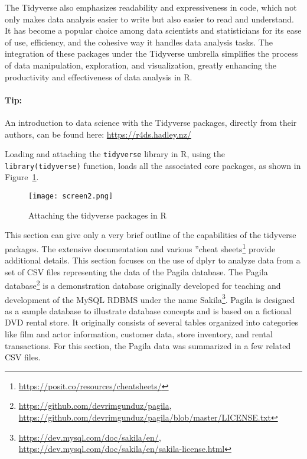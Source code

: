 The Tidyverse also emphasizes readability and expressiveness in code, which not only makes data analysis easier to write but also easier to read and understand. It has become a popular choice among data scientists and statisticians for its ease of use, efficiency, and the cohesive way it handles data analysis tasks. The integration of these packages under the Tidyverse umbrella simplifies the process of data manipulation, exploration, and visualization, greatly enhancing the productivity and effectiveness of data analysis in R.

\begin{tcolorbox}[colback=code]
\paragraph{Tip:} An introduction to data science with the Tidyverse packages, directly from their authors, can be found here: \url{https://r4ds.hadley.nz/}
\end{tcolorbox}

Loading and attaching the \texttt{tidyverse} library in R, using the \texttt{library(tidyverse)} function, loads all the associated core packages, as shown in Figure~\ref{fig:tidyverse}.

\begin{figure}
\centering
\texttt{[image: screen2.png]}
\caption{Attaching the tidyverse packages in R}
\label{fig:tidyverse}
\end{figure}


This section can give only a very brief outline of the capabilities of the tidyverse packages. The extensive documentation and various ''cheat sheets\footnote{\url{https://posit.co/resources/cheatsheets/}} provide additional details. This section focuses on the use of dplyr to analyze data from a set of CSV files representing the data of the Pagila database. The Pagila database\footnote{\url{https://github.com/devrimgunduz/pagila}, \\
\url{https://github.com/devrimgunduz/pagila/blob/master/LICENSE.txt}} is a demonstration database originally developed for teaching and development of the MySQL RDBMS under the name Sakila\footnote{\url{https://dev.mysql.com/doc/sakila/en/}, \\
\url{https://dev.mysql.com/doc/sakila/en/sakila-license.html}}. Pagila is designed as a sample database to illustrate database concepts and is based on a fictional DVD rental store. It originally consists of several tables organized into categories like film and actor information, customer data, store inventory, and rental transactions. For this section, the Pagila data was summarized in a few related CSV files. 

